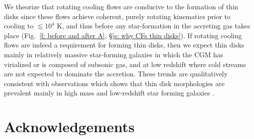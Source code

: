 \documentclass[fleqn,usenatbib]{mnras}
\begin{document}
\begin{enumerate}
    We theorize that rotating cooling flows are conducive to the formation of thin disks since these flows achieve coherent, purely rotating kinematics prior to cooling to $\lesssim10^4$ K, and thus before any star-formation in the accreting gas takes place (Fig.~\ref{f: before and after A}, \S\ref{s: why CFs thin disks}).
    If rotating cooling flows are indeed a requirement for forming thin disks, then we expect thin disks mainly in relatively massive star-forming galaxies in which the CGM has virialized or is composed of subsonic gas, and at low redshift where cold streams are not expected to dominate the accretion.
    These trends are qualitatively consistent with observations which shows that thin disk morphologies are prevalent mainly in high mass and low-redshift star forming galaxies \citep{Kassin2012, Simons2017}. 
\end{enumerate}

\section*{Acknowledgements}
\end{document}
